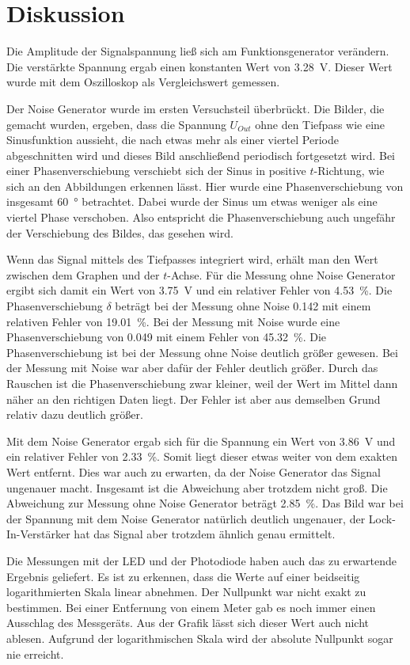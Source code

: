 \section{Diskussion}
\label{sec:Diskussion}

Die Amplitude der Signalspannung ließ sich am Funktionsgenerator verändern. Die verstärkte Spannung ergab einen konstanten 
Wert von \SI{3.28}{\V}. Dieser Wert wurde mit dem Oszilloskop als Vergleichswert gemessen.

\noindent Der Noise Generator wurde im ersten Versuchsteil überbrückt. Die Bilder, die gemacht wurden, ergeben, dass 
die Spannung $U_{Out}$ ohne den Tiefpass wie eine Sinusfunktion aussieht, die nach etwas mehr als einer viertel 
Periode abgeschnitten wird und dieses Bild anschließend periodisch fortgesetzt wird. 
Bei einer Phasenverschiebung verschiebt sich der Sinus in positive $t$-Richtung, wie sich an den Abbildungen 
erkennen lässt. Hier wurde eine Phasenverschiebung von insgesamt \SI{60}{\degree} betrachtet.
Dabei wurde der Sinus 
um etwas weniger als eine viertel Phase verschoben. Also entspricht die Phasenverschiebung auch ungefähr der 
Verschiebung des Bildes, das gesehen wird. 

\noindent Wenn das Signal mittels des Tiefpasses integriert wird, erhält man den Wert zwischen dem Graphen und der 
$t$-Achse. Für die Messung ohne Noise Generator ergibt sich damit ein Wert von \SI{3.75}{\volt} und ein relativer 
Fehler von \SI{4.53}{\percent}. Die Phasenverschiebung $\delta$ beträgt bei der Messung ohne Noise \num{0.142} mit einem relativen Fehler von \SI{19.01}{\percent}. 
Bei der Messung mit Noise wurde eine Phasenverschiebung von \num{0.049} mit einem Fehler von \SI{45.32}{\percent}. 
Die Phasenverschiebung ist bei der Messung ohne Noise deutlich größer gewesen. Bei der Messung mit Noise war aber dafür der Fehler deutlich größer. Durch das Rauschen ist die Phasenverschiebung zwar kleiner, weil der Wert im Mittel dann näher an den richtigen Daten liegt. Der Fehler ist aber aus demselben Grund relativ dazu deutlich größer.   
 


\noindent Mit dem Noise Generator ergab sich für die Spannung ein Wert von \SI{3.86}{\volt} und ein relativer 
Fehler von \SI{2.33}{\percent}. Somit liegt dieser etwas weiter von dem exakten Wert entfernt. Dies war auch zu 
erwarten, da der Noise Generator das Signal ungenauer macht. Insgesamt ist die Abweichung aber trotzdem nicht
groß. Die Abweichung zur Messung ohne Noise Generator beträgt \SI{2.85}{\percent}. Das Bild war bei der Spannung mit dem Noise Generator natürlich deutlich ungenauer, 
der Lock-In-Verstärker hat das Signal aber trotzdem ähnlich genau ermittelt. 

\noindent Die Messungen mit der LED und der Photodiode haben auch das zu erwartende Ergebnis geliefert. Es ist zu 
erkennen, dass die Werte auf einer beidseitig logarithmierten Skala linear abnehmen. Der Nullpunkt war nicht exakt 
zu bestimmen. Bei einer Entfernung von einem Meter gab es noch immer einen Ausschlag des Messgeräts. Aus der Grafik 
lässt sich dieser Wert auch nicht ablesen. Aufgrund der logarithmischen Skala wird der absolute Nullpunkt sogar nie 
erreicht.  
